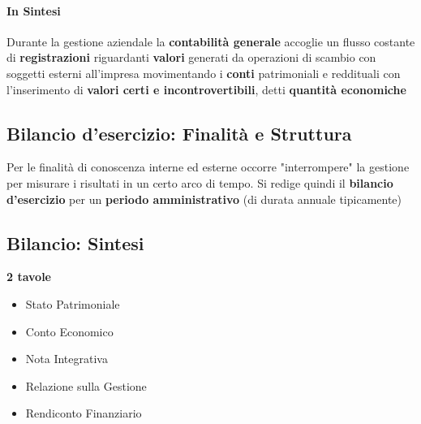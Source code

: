 \documentclass[12pt]{article}
\begin{document}
\paragraph{In Sintesi}
Durante la gestione aziendale la \textbf{contabilità generale} accoglie un flusso costante di \textbf{registrazioni} riguardanti \textbf{valori} generati da operazioni di scambio con soggetti esterni all’impresa movimentando i \textbf{conti} patrimoniali e reddituali con l'inserimento di \textbf{valori certi e incontrovertibili}, detti \textbf{quantità economiche}

\subsection{Bilancio d'esercizio: Finalità e Struttura}
Per le finalità di conoscenza interne ed esterne occorre "interrompere" la gestione per misurare i risultati in un certo arco di tempo.
Si redige quindi il \textbf{bilancio d'esercizio} per un \textbf{periodo amministrativo} (di durata annuale tipicamente)

\subsection{Bilancio: Sintesi}
\textbf{2 tavole}
\begin{itemize}
    \item Stato Patrimoniale
    \item Conto Economico
    \item Nota Integrativa
    \item Relazione sulla Gestione
    \item Rendiconto Finanziario
\end{itemize}
\end{document}
